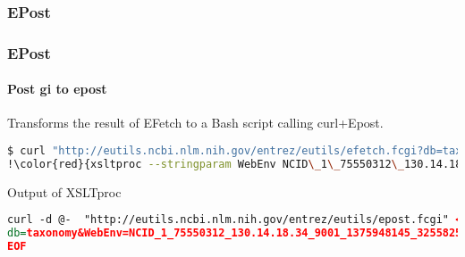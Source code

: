 \documentclass{beamer}
\begin{document}
\begin{frame}[fragile]
\frametitle{EPost}

\end{frame}

\begin{frame}[fragile]
\frametitle{EPost}
\framesubtitle{Post gi to epost}
Transforms the result of EFetch to a Bash script calling curl+Epost.
\begin{lstlisting}[language=bash,basicstyle=\tiny,breaklines=true,escapechar=\!]
$ curl "http://eutils.ncbi.nlm.nih.gov/entrez/eutils/efetch.fcgi?db=taxonomy&!\color{red}{query\_key=1\&WebEnv=NCID\_1\_75550312\_130.14.18.34\_9001\_1375948145\_325582538}!&retmode=xml" |\
!\color{red}{xsltproc --stringparam WebEnv NCID\_1\_75550312\_130.14.18.34\_9001\_1375948145\_325582538 ncbi2epost.xsl}! -
\end{lstlisting}

Output of XSLTproc
\begin{lstlisting}[language=xml,basicstyle=\tiny,breaklines=true,escapechar=\%]
curl -d @-  "http://eutils.ncbi.nlm.nih.gov/entrez/eutils/epost.fcgi" <<EOF
db=taxonomy&WebEnv=NCID_1_75550312_130.14.18.34_9001_1375948145_325582538&id=1225531,1225530,1211276,1211275,1027716,948961,943952,867394,867393,748142,748141,741158,703576,703571,703559,693865,686441,665113,659069,656807,647691,647690,643746,643745,643744,643742,577682,572106,572105,572104,572099,572098,570943,570942,570941,551196,544298,523825,523824,523822,523821,523820,518692,518691,518689,475185,436495,436494,436493,436488,402889,399386,399178,386524,379504,363580,363579,363578,363571,339614,339612,339609,328612,314500,307641,304335,272462,268291,251263,251094,251093,239970,239969,237965,230980,230979,227166,227165,223567,222863,222862,216182,216181,201717,201716,192211,188536,187135,187134,187133,187132,187131,187118,184920,180214,173935,148923,147494,147466,147464,136416,136415,126594,126429,115942,107030,103864,94623,92649,92648,89252,89250,63631,63221,54568,54500,54497,54366,54365,48784,46906,39097,39053,39051,37349,37348,37185,27445,27444,20678,13266,13140,9619,9275,9274,9273,8818,8817,8815,8813,8812,8811,8810,8367,3409,
EOF
\end{lstlisting}

\end{frame}
\end{document}

